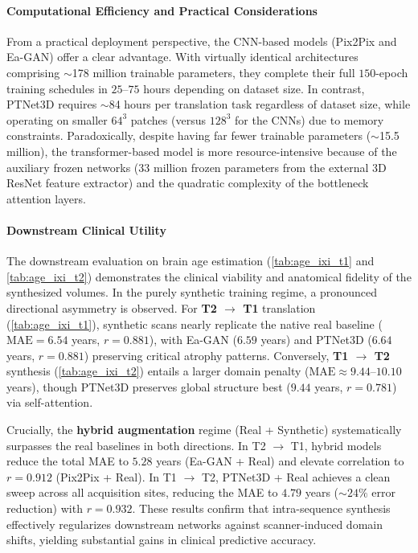 \documentclass[11pt,a4paper]{article}
\begin{document}
\paragraph{Computational Efficiency and Practical Considerations}
From a practical deployment perspective, the CNN-based models (Pix2Pix and Ea-GAN) offer a clear advantage. With virtually identical architectures comprising $\sim$178 million trainable parameters, they complete their full $150$-epoch training schedules in $25$--$75$ hours depending on dataset size. In contrast, PTNet3D requires $\sim$84 hours per translation task regardless of dataset size, while operating on smaller $64^3$ patches (versus $128^3$ for the CNNs) due to memory constraints. Paradoxically, despite having far fewer trainable parameters ($\sim$15.5 million), the transformer-based model is more resource-intensive because of the auxiliary frozen networks (33 million frozen parameters from the external 3D ResNet feature extractor) and the quadratic complexity of the bottleneck attention layers.

\paragraph{Downstream Clinical Utility}
The downstream evaluation on brain age estimation (\autoref{tab:age_ixi_t1} and \autoref{tab:age_ixi_t2}) demonstrates the clinical viability and anatomical fidelity of the synthesized volumes.
In the purely synthetic training regime, a pronounced directional asymmetry is observed. For \textbf{T2 $\rightarrow$ T1} translation (\autoref{tab:age_ixi_t1}), synthetic scans nearly replicate the native real baseline ($\text{MAE} = 6.54$ years, $r = 0.881$), with Ea-GAN ($6.59$ years) and PTNet3D ($6.64$ years, $r = 0.881$) preserving critical atrophy patterns. Conversely, \textbf{T1 $\rightarrow$ T2} synthesis (\autoref{tab:age_ixi_t2}) entails a larger domain penalty ($\text{MAE} \approx 9.44$--$10.10$ years), though PTNet3D preserves global structure best ($9.44$ years, $r = 0.781$) via self-attention.

Crucially, the \textbf{hybrid augmentation} regime (Real + Synthetic) systematically surpasses the real baselines in both directions. In T2 $\rightarrow$ T1, hybrid models reduce the total MAE to $\mathbf{5.28}$ years (Ea-GAN + Real) and elevate correlation to $r = \mathbf{0.912}$ (Pix2Pix + Real). In T1 $\rightarrow$ T2, PTNet3D + Real achieves a clean sweep across all acquisition sites, reducing the MAE to $\mathbf{4.79}$ years ($\sim 24\%$ error reduction) with $r = \mathbf{0.932}$. These results confirm that intra-sequence synthesis effectively regularizes downstream networks against scanner-induced domain shifts, yielding substantial gains in clinical predictive accuracy.
\end{document}
